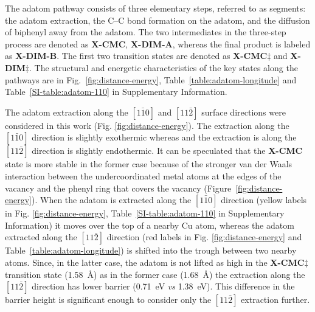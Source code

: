 \documentclass[%
 reprint,
 amsmath,amssymb,
 aps,
prb,
floatfix,
]{revtex4-2}
\newcommand{\lock}{\color{red}}
\newcommand{\lock}{\color{black}}
\newcommand{\sinfo}{Supplementary Information}
\begin{document}
{\lock

The adatom pathway consists of three elementary steps, referred to as segments: the adatom extraction, the C--C bond formation on the adatom, and the diffusion of biphenyl away from the adatom. The two intermediates in the three-step process are denoted as \textbf{X-CMC}, \textbf{X-DIM-A}, whereas the final product is labeled as \textbf{X-DIM-B}. The first two transition states are denoted as \textbf{X-CMC$\ddagger$} and \textbf{X-DIM$\ddagger$}. The structural and energetic characteristics of the key states along the pathways are in Fig.~\ref{fig:distance-energy}, Table~\ref{table:adatom-longitude} and Table~\ref{SI-table:adatom-110} in \sinfo.

The adatom extraction along the $[1\bar{1}0]$ and $[11\bar{2}]$ surface directions were considered in this work (Fig. \ref{fig:distance-energy}). 
%
The extraction along the $[1\bar{1}0]$ direction is slightly exothermic whereas and the extraction is along the $[11\bar{2}]$ direction is slightly endothermic. It can be speculated that the \textbf{X-CMC} state is more stable in the former case because of the stronger van der Waals interaction between the undercoordinated metal atoms at the edges of the vacancy and the phenyl ring that covers the vacancy (Figure~\ref{fig:distance-energy}).
%
When the adatom is extracted along the $[1\bar{1}0]$ direction (yellow labels in Fig. \ref{fig:distance-energy}, Table~\ref{SI-table:adatom-110} in \sinfo) it moves over the top of a nearby Cu atom, whereas the adatom extracted along the $[11\bar{2}]$ direction (red labels in Fig. \ref{fig:distance-energy} and Table~\ref{table:adatom-longitude}) is shifted into the trough between two nearby atoms. Since, in the latter case, the adatom is not lifted as high in the \textbf{X-CMC$\ddagger$} transition state (\SI{1.58}{\angstrom}) as in the former case (\SI{1.68}{\angstrom}) the extraction along the $[11\bar{2}]$ direction has lower barrier (\SI{0.71}{\electronvolt} \emph{vs} \SI{1.38}{\electronvolt}). This difference in the barrier height is significant enough to consider only the $[11\bar{2}]$ extraction further.

}
\end{document}

